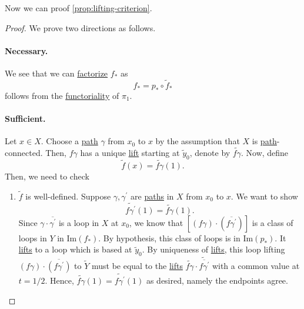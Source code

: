 Now we can proof \autoref{prop:lifting-criterion}.
\begin{proof}\let\qed\relax
	We prove two directions as follows.
	\paragraph{Necessary.} We see that we can \hyperref[def:factorization]{factorize} \(f_\ast\) as
	\[
		f_\ast = p_\ast \circ \widetilde{f} _\ast
	\]
	follows from the \hyperref[def:functor]{functoriality} of \(\pi _1\).
	\paragraph{Sufficient.} Let \(x\in X\). Choose a \hyperref[def:path]{path} \(\gamma\) from \(x_0\) to \(x\) by the assumption that \(X\) is \hyperref[def:path]{path}-connected.
	Then, \(f \gamma \) has a unique \hyperref[prop:homotopy-lifting-property]{lift} starting at \(\widetilde{y} _0\), denote by \(\widetilde{f\gamma}\).
	Now, define
	\[
		\widetilde{f} (x) = \widetilde{f \gamma } (1).
	\]
	Then, we need to check
	\begin{enumerate}
		\item \(\widetilde{f} \) is well-defined. Suppose \(\gamma , \gamma ^\prime \) are \hyperref[def:path]{paths} in \(X\) from \(x_0\)
		      to \(x\). We want to show
		      \[
			      \widetilde{f \gamma^\prime} (1) = \widetilde{f \gamma } (1).
		      \]
		      Since \(\gamma \cdot \overline{\gamma^\prime}\) is a loop in \(X\) at \(x_{0}\), we know that \([(f \gamma)\cdot (\overline{f \gamma ^\prime}) ]\) is a class of
		      loops in \(Y\) in \(\mathrm{Im} (f_\ast)\). By hypothesis, this class of loops is in \(\mathrm{Im} (p_*)\).
		      It \hyperref[prop:homotopy-lifting-property]{lifts} to a loop which is based at \(\widetilde{y} _0\). By uniqueness of
		      \hyperref[prop:homotopy-lifting-property]{lifts}, this loop lifting \((f \gamma )\cdot \overline{(f \gamma ^\prime )}\) to \(\widetilde{Y} \)
		      must be equal to the \hyperref[prop:homotopy-lifting-property]{lifts} \(\widetilde{f \gamma }\cdot \widetilde{\overline{f \gamma ^\prime }}  \)
		      with a common value at \(t = 1 / 2\). Hence, \(\widetilde{f \gamma }(1) = \widetilde{f \gamma ^\prime }(1)\) as desired, namely the endpoints agree.
		      \begin{figure}[H]
			      \centering
			      \label{fig:pf:prop:lifting-criterion}
		      \end{figure}
	\end{enumerate}
\end{proof}